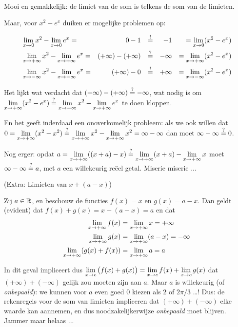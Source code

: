 \documentclass{ximera}
\begin{document}
\begin{example}
	Mooi en gemakkelijk: de limiet van de som is telkens de som van de limieten.
	
	Maar, voor $x^2 - e^x$ duiken er mogelijke problemen op:
	
	\begin{align*}	
	&\limx x^2 - \limx e^x  = & 0 - 1       &&\perinderdaad&& -1 &&= \limx (x^2-e^x) \\
	&\limxi x^2 - \limxi e^x  = & (+\infty)-(+\infty) &&\perhaps&& -\infty &&= \limxi (x^2-e^x)  \\
	&\limxmi x^2 - \limxmi e^x  = & (+\infty)-0  &&\perinderdaad&&  +\infty &&= \limxmi (x^2-e^x)
	\end{align*}
	
	Het lijkt wat verdacht dat $(+\infty) - (+\infty)  \overset{?}{=} -\infty$, wat nodig is om $\limxi (x^2-e^x)  \perhaps \limxi x^2  - \limxi e^x$ te doen kloppen.  
	
	En het geeft inderdaad een onoverkomelijk probleem: als we ook willen dat $0 = \limxi (x^2  - x^2)  \perhaps \limxi x^2  - \limxi x^2  = \infty - \infty$  dan moet $\infty - \infty \overset{?}{=} 0$. 
	
	Nog erger: opdat $a = \limxi ((x+a) - x) \overset{?}{=} \limxi (x+a) - \limxi x$ moet $\infty - \infty \overset{?}{=} a$, met $a$ een willekeurig reëel getal. Miserie miserie ...  

\end{example}
\begin{example}(Extra: Limieten van $x + (a-x)$)
	
	Zij $a\in\mathbb{R}$, en beschouw de functies $f(x)=x$ en $g(x)=a-x$. Dan geldt (evident) dat $f(x)+g(x)=x+(a-x)=a$ en dat 
	\begin{align*}
	\limxi f(x) & = \limxi x = +\infty \\
	\limxi g(x) & = \limxi (a-x) = -\infty \\
	\limxi (g(x)+f(x)) & = \limxi a = a \\
	\end{align*}
	
	{
	\centering
	}
	
	In dit geval impliceert dus $\limxc \big(f(x) +g(x)\big) = \limxc f(x) + \limxc g(x)$ dat $(+\infty) + (-\infty)$ gelijk zou moeten zijn aan $a$. Maar $a$ is willekeurig (of \textit{onbepaald}): we kunnen voor $a$ even goed $0$ kiezen als $2$ of $2\pi/3$ \dots! Dus: de rekenregels voor de som van limieten impliceren dat $(+\infty)+(-\infty)$ elke waarde kan aannemen, en dus noodzakelijkerwijze \textit{onbepaald} moet blijven. Jammer maar helaas ...
	
	
\end{example}
\end{document}
